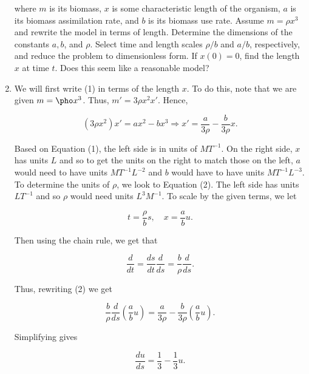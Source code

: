 \documentclass[12pt]{article}
\makeatletter
\theoremstyle{definition}
\theoremstyle{remark}
\newenvironment{solution}[1][\bf{\textit{Solution}}]{\par
  
  \normalfont \topsep6\p@\@plus6\p@\relax
  \list{}{\leftmargin=0mm
          \rightmargin=0mm
          \settowidth{\itemindent}{\itshape#1}%
          \labelwidth=\itemindent
          \parsep=0pt \listparindent=\parindent 
  }
  \item[\hskip\labelsep
        \itshape
    #1\@addpunct{.}]\ignorespaces
}{%
  \popQED\endlist\@endpefalse
}
\makeatother
\begin{document}
\begin{enumerate}[leftmargin=*]
    where $m$ is its biomass, $x$ is some characteristic length of the organism, $a$ is its biomass assimilation rate, and $b$ is its biomass use rate. Assume $m=\rho x^3$ and rewrite the model in terms of length. Determine the dimensions of the constants $a,b$, and $\rho$. Select time and length scales $\rho/b$ and $a/b$, respectively, and reduce the problem to dimensionless form. If $x(0)=0$, find the length $x$ at time $t$. Does this seem like a reasonable model?
    
    \begin{solution}
        We will first write (1) in terms of the length $x$. To do this, note that we are given $m=\pho x^3$. Thus, $m'=3\rho x^2 x'$. Hence,
        
        \begin{equation}
            (3\rho x^2) x'=ax^2-bx^3\Rightarrow x'=\frac{a}{3\rho}-\frac{b}{3\rho}x.
        \end{equation}
        
        Based on Equation (1), the left side is in units of $MT^{-1}$. On the right side, $x$ has units $L$ and so to get the units on the right to match those on the left, $a$ would need to have units $MT^{-1}L^{-2}$ and $b$ would have to have units $MT^{-1}L^{-3}$. To determine the units of $\rho$, we look to Equation (2). The left side has units $LT^{-1}$ and so $\rho$ would need units $L^3M^{-1}$. To scale by the given terms, we let 
    
        \begin{equation*}
            t=\frac{\rho}{b}s,\quad x=\frac{a}{b}u.
        \end{equation*}
    
        Then using the chain rule, we get that 
    
        \begin{equation*}
            \frac{d}{dt}=\frac{ds}{dt}\frac{d}{ds}=\frac{b}{\rho}\frac{d}{ds}.
        \end{equation*}
    
        Thus, rewriting (2) we get
        
        \begin{equation*}
            \frac{b}{\rho}\frac{d}{ds}(\frac{a}{b}u)=\frac{a}{3\rho}-\frac{b}{3\rho}(\frac{a}{b}u).
        \end{equation*}
        
        Simplifying gives
        
        \begin{equation*}
            \frac{du}{ds}=\frac{1}{3}-\frac{1}{3}u.
        \end{equation*}
        

\end{solution}
\end{enumerate}
\end{document}
